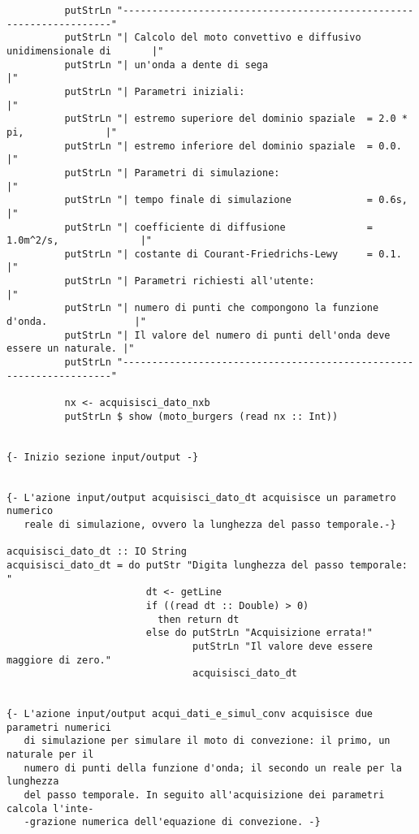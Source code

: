 \begin{verbatim}
          putStrLn "--------------------------------------------------------------------"
          putStrLn "| Calcolo del moto convettivo e diffusivo unidimensionale di       |"
          putStrLn "| un'onda a dente di sega                                          |"
          putStrLn "| Parametri iniziali:                                              |"
          putStrLn "| estremo superiore del dominio spaziale  = 2.0 * pi,              |"
          putStrLn "| estremo inferiore del dominio spaziale  = 0.0.                   |" 
          putStrLn "| Parametri di simulazione:                                        |"
          putStrLn "| tempo finale di simulazione             = 0.6s,                  |" 
          putStrLn "| coefficiente di diffusione              = 1.0m^2/s,              |" 
          putStrLn "| costante di Courant-Friedrichs-Lewy     = 0.1.                   |" 
          putStrLn "| Parametri richiesti all'utente:                                  |" 
          putStrLn "| numero di punti che compongono la funzione d'onda.               |"
          putStrLn "| Il valore del numero di punti dell'onda deve essere un naturale. |"
          putStrLn "--------------------------------------------------------------------"

          nx <- acquisisci_dato_nxb 
          putStrLn $ show (moto_burgers (read nx :: Int))


{- Inizio sezione input/output -}


{- L'azione input/output acquisisci_dato_dt acquisisce un parametro numerico
   reale di simulazione, ovvero la lunghezza del passo temporale.-}

acquisisci_dato_dt :: IO String
acquisisci_dato_dt = do putStr "Digita lunghezza del passo temporale: "
                        dt <- getLine
                        if ((read dt :: Double) > 0)
                          then return dt
                        else do putStrLn "Acquisizione errata!"
                                putStrLn "Il valore deve essere maggiore di zero."
                                acquisisci_dato_dt 


{- L'azione input/output acqui_dati_e_simul_conv acquisisce due parametri numerici
   di simulazione per simulare il moto di convezione: il primo, un naturale per il 
   numero di punti della funzione d'onda; il secondo un reale per la lunghezza
   del passo temporale. In seguito all'acquisizione dei parametri calcola l'inte- 
   -grazione numerica dell'equazione di convezione. -}


\end{verbatim}
